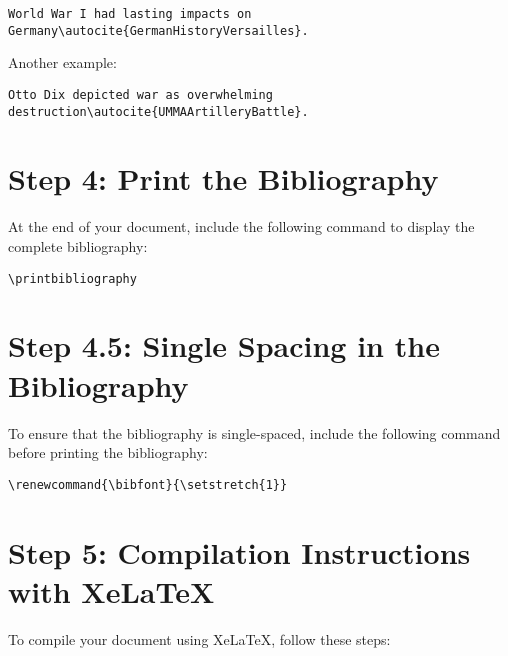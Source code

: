 \documentclass{article}
\begin{document}
\begin{lstlisting}
World War I had lasting impacts on Germany\autocite{GermanHistoryVersailles}.
\end{lstlisting}

Another example:

\begin{lstlisting}
Otto Dix depicted war as overwhelming destruction\autocite{UMMAArtilleryBattle}.
\end{lstlisting}

\bigskip

\section*{Step 4: Print the Bibliography}

At the end of your document, include the following command to display the complete bibliography:

\begin{lstlisting}
\printbibliography
\end{lstlisting}

\bigskip

\section*{Step 4.5: Single Spacing in the Bibliography}

To ensure that the bibliography is single-spaced, include the following command before printing the bibliography:

\begin{lstlisting}
\renewcommand{\bibfont}{\setstretch{1}}
\end{lstlisting}

\bigskip

\section*{Step 5: Compilation Instructions with XeLaTeX}

To compile your document using XeLaTeX, follow these steps:
\end{document}
